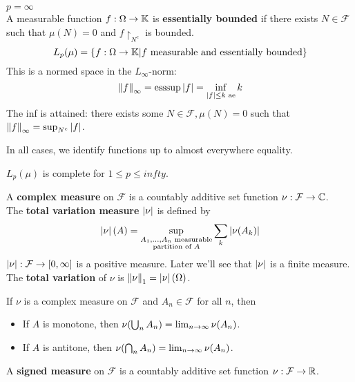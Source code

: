\documentclass{article}
\begin{document}
$p = \infty$ \\
A measurable function $f : \Omega \rightarrow \mathbb K$ is {\bf essentially bounded} if there exists $N \in \mathcal F$ such that $\mu(N) = 0$ and $f\restriction_{N^c}$ is bounded.
$$L_p(\mu) = \{f : \Omega \rightarrow \mathbb K | f \text{ measurable and essentially bounded}\}$$
This is a normed space in the $L_\infty$-norm:
$$\left\lVert f\right\rVert_\infty = \operatorname{ess sup} \left\lvert f\right\rvert = \inf_{\left\lvert f\right\rvert \le k \text{ ae}} k$$
The inf is attained: there exists some $N \in \mathcal F, \mu(N) = 0$ such that $\left\lVert f\right\rVert_\infty = \sup_{N^c} \left\lvert f\right\rvert$.

In all cases, we identify functions up to almost everywhere equality.

\begin{nthm}
  $L_p(\mu)$ is complete for $1 \le p \le infty$.
\end{nthm}

\begin{defi}
  A {\bf complex measure} on $\mathcal F$ is a countably additive set function $\nu : \mathcal F \rightarrow \mathbb C$. \\
  The {\bf total variation measure} $\left\lvert \nu\right\rvert$ is defined by
  $$\left\lvert \nu\right\rvert(A) = \sup_{\substack{A_1, \dots, A_n \text{ measurable} \\ \text{partition of } A}} \sum_k \left\lvert \nu(A_k)\right\rvert$$
  $\left\lvert \nu\right\rvert : \mathcal F \rightarrow [0, \infty]$ is a positive measure. Later we'll see that $\left\lvert \nu\right\rvert$ is a finite measure. \\
  The {\bf total variation} of $\nu$ is $\left\lVert \nu\right\rVert_1 = \left\lvert \nu\right\rvert(\Omega)$.
\end{defi}

\begin{prop}
  If $\nu$ is a complex measure on $\mathcal F$ and $A_n \in \mathcal F$ for all $n$, then
  \begin{itemize}
    \item If $A$ is monotone, then $\nu(\bigcup_n A_n) = \lim_{n \rightarrow \infty} \nu(A_n)$.
    \item If $A$ is antitone, then $\nu(\bigcap_n A_n) = \lim_{n \rightarrow \infty} \nu(A_n)$.
  \end{itemize}
\end{prop}

\begin{defi}
  A {\bf signed measure} on $\mathcal F$ is a countably additive set function $\nu : \mathcal F \rightarrow \mathbb R$.
\end{defi}
\end{document}

